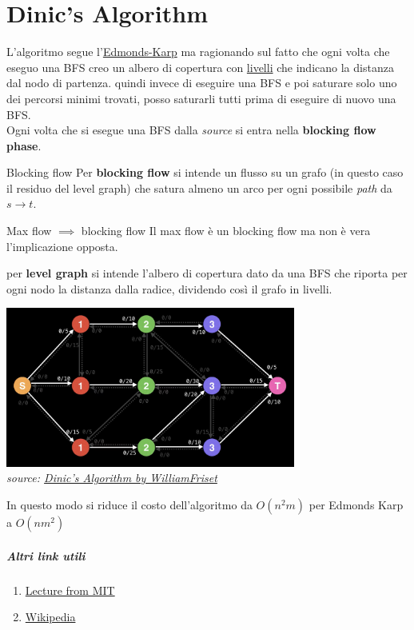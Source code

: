 
\chapter{Dinic's Algorithm} \label{dnc}

L'algoritmo segue l'\href{https://en.wikipedia.org/wiki/Edmonds%E2%80%93Karp_algorithm}{Edmonds-Karp} ma ragionando sul fatto che ogni volta che eseguo una BFS creo un albero di copertura con \underline{livelli} che indicano la distanza dal nodo di partenza.
quindi invece di eseguire una BFS e poi saturare solo uno dei percorsi minimi trovati, posso saturarli tutti prima di eseguire di nuovo una BFS.\\
Ogni volta che si esegue una BFS dalla \textit{source} si entra nella \textbf{blocking flow phase}.\\
\begin{definition}{Blocking flow}{}
    Per \textbf{blocking flow} si intende un flusso su un grafo (in questo caso il residuo del level graph) che satura almeno un arco per ogni possibile \textit{path} da $s\rightarrow t$.    
\end{definition}
\begin{obs}{Max flow $\implies$ blocking flow}{}
    Il max flow è un blocking flow ma non è vera l'implicazione opposta.
\end{obs}
per \textbf{level graph} si intende l'albero di copertura dato da una BFS che riporta per ogni nodo la distanza dalla radice, dividendo così il grafo in livelli.
\begin{center}
    \includegraphics[height=5.25cm]{resources/images/levelGraph.png}\\
    \textit{source: \href{https://www.youtube.com/watch?v=M6cm8UeeziI&t=2s}{Dinic's Algorithm by WilliamFriset}}
\end{center}
In questo modo si riduce il costo dell'algoritmo da $O(n^2m)$ per Edmonds Karp a $O(nm^2)$
\paragraph{Altri link utili}\begin{enumerate}
    \item \href{http://courses.csail.mit.edu/6.854/16/Notes/n10-blocking_flows.html}{Lecture from MIT}
    \item \href{https://en.wikipedia.org/wiki/Dinic%27s_algorithm}{Wikipedia}
\end{enumerate}

\cleardoublepage

